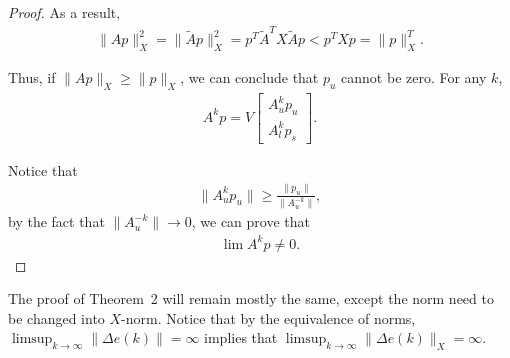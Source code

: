 \documentclass{article}
\begin{document}
\begin{proof}
As a result,
\begin{align*}
  \|Ap\|_X^2 =  \|\tilde Ap\|_X^2 = p^T\tilde A^TX\tilde Ap < p^T X p = \|p\|_X^T.
\end{align*}

Thus, if $\|Ap\|_X \geq \|p\|_X$, we can conclude that $p_u$ cannot be zero. For any $k$, 
\begin{align*}
A^k p = V \begin{bmatrix}
    A_u^kp_u\\
   A_l^kp_s 
  \end{bmatrix}.
\end{align*}

Notice that
\begin{align*}
 \| A_u^k p_u \|   \geq \frac{\|p_u\|}{\|A_u^{-k}\|},
\end{align*}
by the fact that $\|A_u^{-k}\| \rightarrow 0$, we can prove that
\begin{align*}
 \lim A^k p \neq 0.
\end{align*}
\end{proof}

The proof of Theorem~2 will remain mostly the same, except the norm need to be changed into $X$-norm. Notice that by the equivalence of norms, $\limsup_{k\rightarrow\infty}\|\Delta e(k)\|= \infty$ implies that $\limsup_{k\rightarrow\infty}\|\Delta e(k)\|_X= \infty$.
\end{document}
